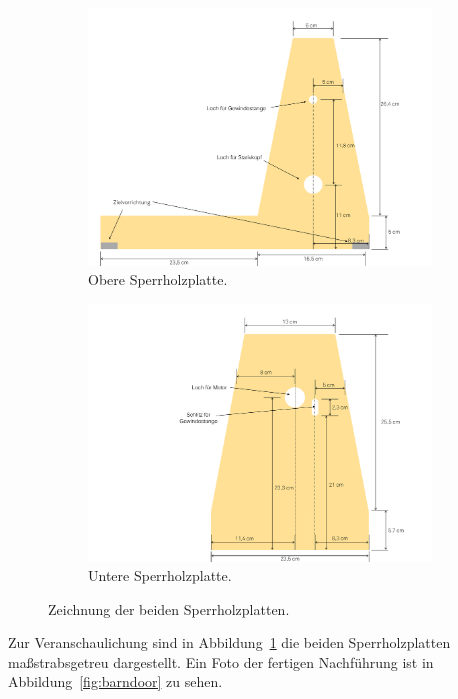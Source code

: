 \documentclass[
  bibliography=totoc,     %
  captions=tableheading,  %
  titlepage=firstiscover, %
  twocolumn,
]{scrartcl}
\begin{document}
\begin{figure}
  \centering%
  \begin{subfigure}{0.75\columnwidth}
    \includegraphics[width=\linewidth]{images/NachfuehrungSchemaOben.pdf}%
    \caption{Obere Sperrholzplatte.}
  \end{subfigure}
  \begin{subfigure}{0.75\columnwidth}
    \includegraphics[width=\linewidth]{images/NachfuehrungSchemaUnten.pdf}%
    \caption{Untere Sperrholzplatte.}
  \end{subfigure}
  \caption{Zeichnung der beiden Sperrholzplatten.}%
  \label{fig:schema}
\end{figure}

Zur Veranschaulichung sind in Abbildung~\ref{fig:schema} die beiden Sperrholzplatten maßstrabsgetreu dargestellt.
Ein Foto der fertigen Nachführung ist in Abbildung~\ref{fig:barndoor} zu sehen.
\end{document}
